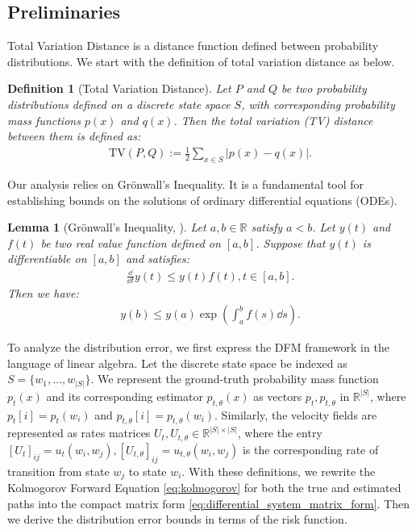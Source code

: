 \documentclass[12pt]{article}
\numberwithin{equation}{section}
\def\R{\mathbb{R}}
\let\cite\citep
\theoremstyle{theoremstyle}
\newtheorem{lemma}{Lemma}[section]
\newtheorem{definition}{Definition}[section]
\numberwithin{equation}{section}
\numberwithin{theorem}{section}
\numberwithin{proposition}{section}
\numberwithin{definition}{section}
\numberwithin{lemma}{section}
\numberwithin{assumption}{section}
\numberwithin{remark}{section}
\begin{document}
\subsection{Preliminaries}
\label{sec:pre_error_bound_dfm}
Total Variation Distance is a distance function defined between probability distributions.
We start with the definition of total variation distance as below.
\begin{definition}[Total Variation Distance]
\label{def:tv_distance}
Let $P$ and $Q$ be two probability distributions defined on a discrete state space $S$, with corresponding probability mass functions $p(x)$ and $q(x)$. 
Then the total variation (TV) distance between them is defined as:
\begin{align*}
    \text{TV}(P,Q) := \frac{1}{2} \sum_{x \in S} |p(x)-q(x)|.
\end{align*}
\end{definition}

Our analysis relies on Grönwall’s Inequality.
It is a fundamental tool for establishing bounds on the solutions of ordinary differential equations (ODEs).
\begin{lemma}[Grönwall’s Inequality, \cite{gronwall1919note}]
\label{lem:grönwall_inequality}
Let $a,b\in\R$ satisfy $a<b$.
Let $y(t)$ and $f(t)$ be two real value function defined on $[a,b]$.
Suppose that $y(t)$ is differentiable on $[a,b]$ and satisfies:
\begin{align*}
    \frac{\dd }{\dd t}y(t)\leq y(t)f(t), t\in[a,b].
\end{align*}
Then we have:
\begin{align*}
    y(b)\leq y(a)\exp(\int_a^b f(s) \dd s).
\end{align*}
\end{lemma}


To analyze the distribution error, we first express the DFM framework in the language of linear algebra. 
Let the discrete state space be indexed as $S = \{w_1, \ldots, w_{|S|}\}$. 
We represent the ground-truth probability mass function $p_t(x)$ and its corresponding estimator $p_{t,\theta}(x)$ as vectors $p_t, p_{t,\theta}$ in $\mathbb{R}^{|S|}$, where $p_t[i] = p_t(w_i)$ and $p_{t,\theta}[i] = p_{t,\theta}(w_i)$.
Similarly, the velocity fields are represented as rates matrices $U_t, U_{t,\theta} \in \mathbb{R}^{|S|\times|S|}$, where the entry $[U_t]_{ij} = u_t(w_i, w_j),[U_{t,\theta}]_{ij} = u_{t,\theta}(w_i, w_j)$ is the corresponding rate of transition from state $w_j$ to state $w_i$. 
With these definitions,  we rewrite the Kolmogorov Forward Equation \eqref{eq:kolmogorov} for both the true and estimated paths into the compact matrix form \eqref{eq:differential_system_matrix_form}.
Then we derive the distribution error bounds in terms of the risk function.
\end{document}
